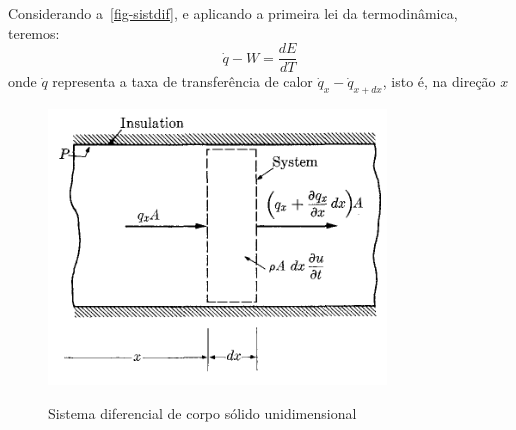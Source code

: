 \documentclass[
	12pt,				  %
	openright,		%
	twoside,			%
	a4paper,			%
	chapter=TITLE,		    %
	english,			%
	brazil				%
	]{abntex2}
\begin{document}
Considerando a~\autoref{fig-sistdif}, e aplicando a primeira lei da
termodinâmica, teremos:
\begin{equation}
    \dot{q} - W = \frac{dE}{dT} \label{eq:firstlaw}
\end{equation}
onde $\dot{q}$ representa a taxa de transferência de calor $\dot{q}_x -
\dot{q}_{x + dx}$, isto é, na direção $x$
\begin{figure}[!htb]
\centering
\caption[Sistema diferencial de corpo sólido unidimensional]{Sistema diferencial de corpo sólido unidimensional}
\includegraphics[width=0.8\textwidth]{figures/systdif.pdf}
\label{fig-sistdif}
\end{figure}
\end{document}
